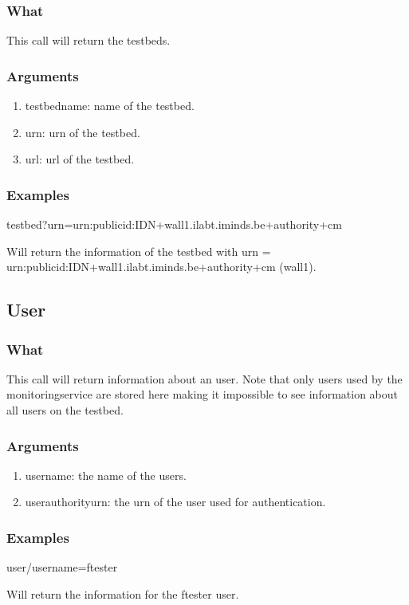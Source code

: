 \begin{otherlanguage}{english}
\subsubsection{What}
This call will return the testbeds.
\subsubsection{Arguments}
\begin{enumerate}
\item testbedname: name of the testbed.
\item urn: urn of the testbed.
\item url: url of the testbed.
\end{enumerate}
\subsubsection{Examples}
\begin{lt}
testbed?urn=urn:publicid:IDN+wall1.ilabt.iminds.be+authority+cm
\end{lt}
Will return the information of the testbed with urn = \\
urn:publicid:IDN+wall1.ilabt.iminds.be+authority+cm (wall1).
\\
\subsection{User}
\subsubsection{What}
This call will return information about an user. Note that only users used by the monitoringservice are stored here making it impossible to see information about all users on the testbed.
\subsubsection{Arguments}
\begin{enumerate}
\item username: the name of the users.
\item userauthorityurn: the urn of the user used for authentication.
\end{enumerate}
\subsubsection{Examples}
\begin{lt}
user/username=ftester
\end{lt}
Will return the information for the ftester user.
\\

\end{otherlanguage}
